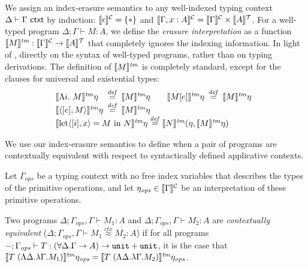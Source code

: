 We assign an index-erasure semantics to any well-indexed typing
context $\Delta \vdash \Gamma \textsf{ ctxt}$ by induction:
$\llbracket \epsilon \rrbracket^{\mathcal{C}} = \{*\}$ and $\llbracket \Gamma, x : A \rrbracket^{\mathcal{C}} =
\llbracket \Gamma \rrbracket^{\mathcal{C}} \times \llbracket A \rrbracket^{\mathcal{T}}$. For a well-typed program $\Delta;
\Gamma \vdash M : A$, we define the \emph{erasure interpretation} as a
function $\llbracket M \rrbracket^{\mathit{tm}} : \llbracket \Gamma \rrbracket^{\mathcal{C}} \to \llbracket A \rrbracket^{\mathcal{T}}$ that completely
ignores the indexing information. In light of
, %
directly on the syntax of well-typed programs, rather than on typing
derivations. The definition of $\llbracket M \rrbracket^{\mathit{tm}}$ is completely standard,
except for the clauses for universal and existential types:
\begin{displaymath}
  \begin{array}{@{}l}
    \begin{array}{@{}l@{\hspace{0.5em}}c@{\hspace{0.5em}}l@{\hspace{2em}}l@{\hspace{0.5em}}c@{\hspace{0.5em}}l@{}}
      \tmSem{\Lambda i.\ M}\eta & \isDefinedAs & \tmSem{M}\eta
      &
      \tmSem{M[e]}\eta & \isDefinedAs & \tmSem{M}\eta \\
      \tmSem{\langle [e], M\rangle}\eta & \isDefinedAs & \tmSem{M}\eta
    \end{array} \\
    \tmSem{\mathrm{let}\langle[i], x\rangle = M\ \mathrm{in}\ N}\eta \isDefinedAs \tmSem{N}(\eta, \tmSem{M}\eta)
  \end{array}
\end{displaymath}

We use our index-erasure semantics to define when a pair of programs
are contextually equivalent with respect to syntactically defined
applicative contexts.

\begin{definition}\label{defn:ctxt-equiv}
  Let $\Gamma_{\mathit{ops}}$ be a typing context with no free index
  variables that describes the types of the primitive operations, and
  let $\eta_{\mathit{ops}} \in \llbracket \Gamma \rrbracket^{\mathcal{C}}$ be an interpretation
  of these primitive operations.

  Two programs $\Delta; \Gamma_{\mathit{ops}}, \Gamma \vdash M_1 : A$
  and $\Delta; \Gamma_{\mathit{ops}}, \Gamma \vdash M_2 : A$ are
  \emph{contextually equivalent} ($\Delta; \Gamma_{\mathit{ops}},
  \Gamma \vdash M_1 \stackrel{ctx}\approx M_2 : A$) if for all
  programs $-;\Gamma_{\mathit{ops}} \vdash T : (\forall \Delta. \Gamma
  \to A) \to \textup{\texttt{unit}} + \textup{\texttt{unit}}$, it is the case that
  $\llbracket T\ (\Lambda \Delta. \lambda \Gamma. M_1) \rrbracket^{\mathit{tm}}\eta_{\mathit{ops}}
  = \llbracket T\ (\Lambda \Delta. \lambda
    \Gamma. M_2) \rrbracket^{\mathit{tm}}\eta_{\mathit{ops}}$.
\end{definition}

